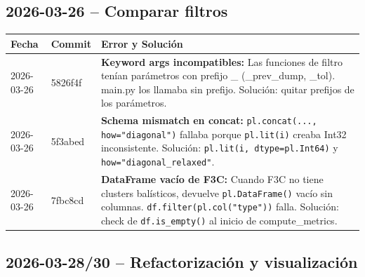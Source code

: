 \documentclass[12pt,a4paper]{article}
\begin{document}
\subsection*{2026-03-26 -- Comparar filtros}

\begin{table}[H]
	\centering
	\begin{tabular}{@{}llp{9cm}@{}}
		\toprule
		\textbf{Fecha} & \textbf{Commit} & \textbf{Error y Solución}                                                                                                                                                                                                                          \\
		\midrule
		2026-03-26     & 5826f4f         & \textbf{Keyword args incompatibles:} Las funciones de filtro tenían parámetros con prefijo \_ (\_prev\_dump, \_tol). main.py los llamaba sin prefijo. Solución: quitar prefijos de los parámetros.                                                 \\
		2026-03-26     & 5f3abed         & \textbf{Schema mismatch en concat:} \texttt{pl.concat(..., how="diagonal")} fallaba porque \texttt{pl.lit(i)} creaba Int32 inconsistente. Solución: \texttt{pl.lit(i, dtype=pl.Int64)} y \texttt{how="diagonal\_relaxed"}.                         \\
		2026-03-26     & 7fbc8cd         & \textbf{DataFrame vacío de F3C:} Cuando F3C no tiene clusters balísticos, devuelve \texttt{pl.DataFrame()} vacío sin columnas. \texttt{df.filter(pl.col("type"))} falla. Solución: check de \texttt{df.is\_empty()} al inicio de compute\_metrics. \\
		\bottomrule
	\end{tabular}
\end{table}

\subsection*{2026-03-28/30 -- Refactorización y visualización}
\end{document}
